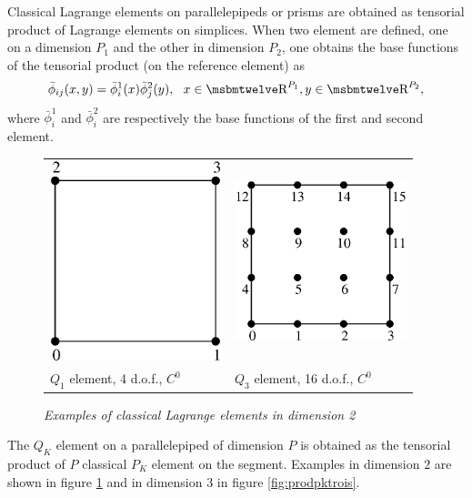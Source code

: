 \documentclass[11pt,a4paper]{article}
\begin{document}
Classical Lagrange elements on parallelepipeds or prisms are obtained as tensorial product of Lagrange elements on simplices. When two element are defined, one on a dimension $P_1$ and the other in dimension $P_2$, one obtains the base functions of the tensorial product (on the reference element) as
$$ \bar{\phi}_{ij}(x,y) = \bar{\phi}^1_i(x) \bar{\phi}^2_j(y), \ \ x \in \Reel^{P_1}, y \in  \Reel^{P_2}, $$
where $\bar{\phi}^1_i$ and $\bar{\phi}^2_i$ are respectively the base functions of the first and second element.


\begin{figure}[H]
  \begin{center} \begin{tabular}{m{7cm}m{7cm}}
    \includegraphics[width=5cm,angle=0]{getfemlist_quad_Q1.eps} & \includegraphics[width=5cm,angle=0]{getfemlist_quad_Q3.eps} \\
    $Q_1$ element, 4 d.o.f., $C^0$ & $Q_3$ element, 16 d.o.f., $C^0$ \\
  \end{tabular} \end{center}
  \caption{ \it Examples of classical Lagrange elements in dimension 2} \label{fig:prodpkdeux}
\end{figure}

The $Q_K$ element on a parallelepiped of dimension $P$ is obtained as the tensorial product of $P$ classical $P_K$ element on the segment. Examples in dimension $2$ are shown in figure \ref{fig:prodpkdeux} and in dimension $3$ in figure \ref{fig:prodpktrois}. \\
\end{document}
